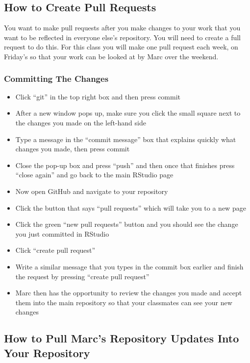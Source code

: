 \documentclass[12pt]{../SOP4_alpha}\usepackage[]{graphicx}\usepackage[]{color}
\begin{document}
\subsection {How to Create Pull Requests}
You want to make pull requests after you make changes to your work that you want to be reflected in everyone else’s repository. You will need to create a full request to do this. For this class you will make one pull request each week, on Friday’s so that your work can be looked at by Marc over the weekend. 

\subsubsection{Committing The Changes}

\begin{itemize}
\item Click “git” in the top right box and then press commit
  \item After a new window pops up, make sure you click the small square next to the changes you made on the left-hand side 
\item Type a message in the “commit message” box that explains quickly what changes you made, then press commit
  \item Close the pop-up box and press “push” and then once that finishes press “close again” and go back to the main RStudio page
\item Now open GitHub and navigate to your repository 
  \item Click the button that says “pull requests” which will take you to a new page
  \item Click the green “new pull requests” button and you should see the change you just committed in RStudio
  \item Click “create pull request”
  \item Write a similar message that you types in the commit box earlier and finish the request by pressing “create pull request” 
  \item Marc then has the opportunity to review the changes you made and accept them into the main repository so that your classmates can see your new changes
\end{itemize}

\subsection{How to Pull Marc’s Repository Updates Into Your Repository}
\end{document}
